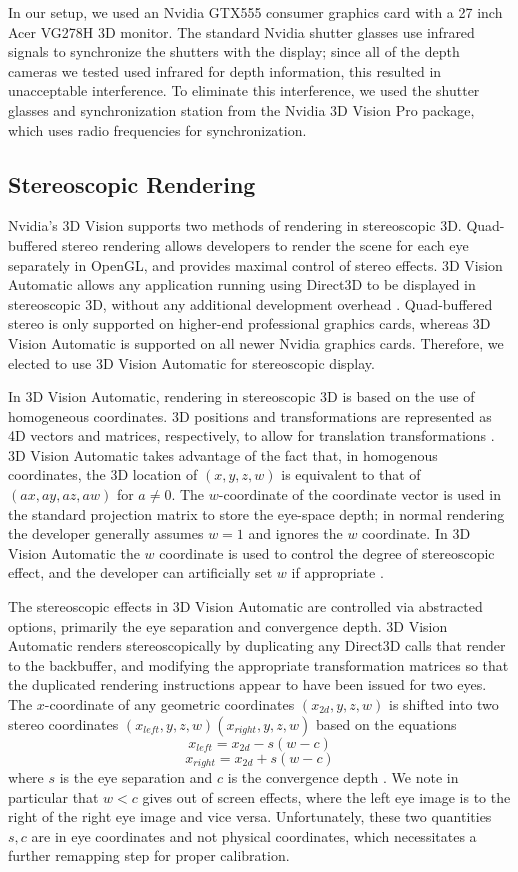 \documentclass[pageno]{jpaper}
\begin{document}
In our setup, we used an Nvidia GTX555 consumer graphics card with a 27 inch Acer VG278H 3D monitor. The standard Nvidia shutter glasses use infrared
signals to synchronize the shutters with the display; since all of the depth cameras we tested used infrared for depth information, this resulted in
unacceptable interference. To eliminate this interference, we used the shutter glasses and synchronization station from the Nvidia 3D Vision Pro
package, which uses radio frequencies for synchronization.

\subsection{Stereoscopic Rendering}
Nvidia's 3D Vision supports two methods of rendering in stereoscopic 3D. Quad-buffered stereo rendering allows developers to render the scene for each
eye separately in OpenGL, and provides maximal control of stereo effects. 3D Vision Automatic allows any application running using Direct3D to be
displayed in stereoscopic 3D, without any additional development overhead \cite{nvidia3dvision}. Quad-buffered stereo is only supported on higher-end
professional graphics cards, whereas 3D Vision Automatic is supported on all newer Nvidia graphics cards. Therefore, we elected to use 3D Vision Automatic
for stereoscopic display.

In 3D Vision Automatic, rendering in stereoscopic 3D is based on the use of homogeneous coordinates. 3D positions and transformations are represented
as 4D vectors and matrices, respectively, to allow for translation transformations \cite{graphicstextbook}. 3D Vision Automatic takes advantage of the
fact that, in homogenous coordinates, the 3D location of $(x, y, z, w)$ is equivalent to that of $(ax, ay, az, aw)$ for $a \ne 0$. The $w$-coordinate
of the coordinate vector is used in the standard projection matrix to store the eye-space depth; in normal rendering the developer generally assumes
$w=1$ and ignores the $w$ coordinate. In 3D Vision Automatic the $w$ coordinate is used to control the degree of stereoscopic effect, and the
developer can artificially set $w$ if appropriate \cite{nvidia3dvision}.

The stereoscopic effects in 3D Vision Automatic are controlled via abstracted options, primarily the eye separation and convergence depth.
3D Vision Automatic renders stereoscopically by duplicating any Direct3D calls that render to the backbuffer, and modifying the appropriate
transformation matrices so that the duplicated rendering instructions appear to have been issued for two eyes. The $x$-coordinate of any geometric
coordinates $(x_{2d}, y, z, w)$ is shifted into two stereo coordinates $(x_{left}, y, z, w)(x_{right}, y, z, w)$ based on the equations
$$x_{left} = x_{2d} - s(w - c)$$
$$x_{right} = x_{2d} + s(w - c)$$
where $s$ is the eye separation and $c$ is the convergence depth \cite{nvidia3dvision}. We note in particular that $w<c$ gives out of screen effects, where
the left eye image is to the right of the right eye image and vice versa. Unfortunately, these two quantities $s, c$ are in eye coordinates and not
physical coordinates, which necessitates a further remapping step for proper calibration.
\end{document}
